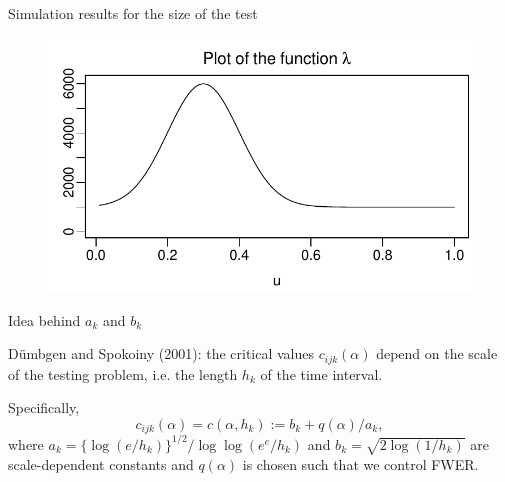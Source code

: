 \documentclass[10pt, handout]{beamer}
\begin{document}
\begin{frame}{Simulation results for the size of the test}
\begin{figure}[t!]
	\includegraphics[height = 0.4\textheight]{plots/lambda_fct}
\end{figure}
\vspace{-2mm}
\scriptsize{\begin{table}[t]
\begin{center}
\caption{Size of the multiscale test}
\label{tab:size_shape}

\end{center}
\end{table}}
\end{frame}



\begin{frame}[label = frame_scaleconstants]{Idea behind $a_k$ and $b_k$}

D{\"u}mbgen and Spokoiny (2001): the critical values $c_{ijk}(\alpha)$ depend on the scale of the testing problem, i.e. the length $h_k$ of the time interval.\pause 

Specifically, 
\[c_{ijk}(\alpha) = c(\alpha,h_k) := b_k + q(\alpha)/a_k,\] where $a_k = \{\log(e/h_k)\}^{1/2} / \log \log(e^e / h_k)$ and $b_k = \sqrt{2 \log(1/h_k)}$ are scale-dependent constants and $q(\alpha)$ is chosen such that we control FWER.
\end{frame}
\end{document}
